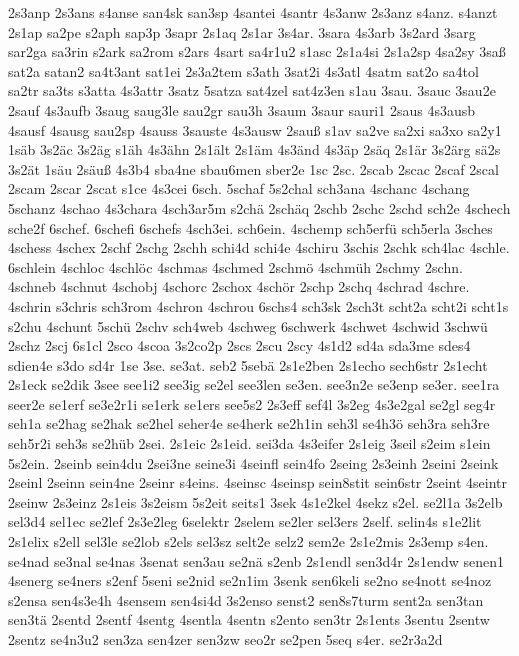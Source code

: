 {2s3anp
2s3ans
s4anse
san4sk
san3sp
4santei
4santr
4s3anw
2s3anz
s4anz.
s4anzt
2s1ap
sa2pe
s2aph
sap3p
3sapr
2s1aq
2s1ar
3s4ar.
3sara
4s3arb
3s2ard
3sarg
sar2ga
sa3rin
s2ark
sa2rom
s2ars
4sart
sa4r1u2
s1asc
2s1a4si
2s1a2sp
4sa2sy
3saß
sat2a
satan2
sa4t3ant
sat1ei
2s3a2tem
s3ath
3sat2i
4s3atl
4satm
sat2o
sa4tol
sa2tr
sa3ts
s3atta
4s3attr
3satz
5satza
sat4zel
sat4z3en
s1au
3sau.
3sauc
3sau2e
2sauf
4s3aufb
3saug
saug3le
sau2gr
sau3h
3saum
3saur
sauri1
2saus
4s3ausb
4sausf
4sausg
sau2sp
4sauss
3sauste
4s3ausw
2sauß
s1av
sa2ve
sa2xi
sa3xo
sa2y1
1säb
3s2äc
3s2äg
s1äh
4s3ähn
2s1ält
2s1äm
4s3änd
4s3äp
2säq
2s1är
3s2ärg
sä2s
3s2ät
1säu
2säuß
4s3b4
sba4ne
sbau6men
sber2e
1sc
2sc.
2scab
2scac
2scaf
2scal
2scam
2scar
2scat
s1ce
4s3cei
6sch.
5schaf
5s2chal
sch3ana
4schanc
4schang
5schanz
4schao
4s3chara
4sch3ar5m
s2chä
2schäq
2schb
2schc
2schd
sch2e
4schech
sche2f
6schef.
6schefi
6schefs
4sch3ei.
sch6ein.
4schemp
sch5erfü
sch5erla
3sches
4schess
4schex
2schf
2schg
2schh
schi4d
schi4e
4schiru
3schis
2schk
sch4lac
4schle.
6schlein
4schloc
4schlöc
4schmas
4schmed
2schmö
4schmüh
2schmy
2schn.
4schneb
4schnut
4schobj
4schorc
2schox
4schör
2schp
2schq
4schrad
4schre.
4schrin
s3chris
sch3rom
4schron
4schrou
6schs4
sch3sk
2sch3t
scht2a
scht2i
scht1s
s2chu
4schunt
5schü
2schv
sch4web
4schweg
6schwerk
4schwet
4schwid
3schwü
2schz
2scj
6s1cl
2sco
4scoa
3s2co2p
2scs
2scu
2scy
4s1d2
sd4a
sda3me
sdes4
sdien4e
s3do
sd4r
1se
3se.
se3at.
seb2
5sebä
2s1e2ben
2s1echo
sech6str
2s1echt
2s1eck
se2dik
3see
see1i2
see3ig
se2el
see3len
se3en.
see3n2e
se3enp
se3er.
see1ra
seer2e
se1erf
se3e2r1i
se1erk
se1ers
see5s2
2s3eff
sef4l
3s2eg
4s3e2gal
se2gl
seg4r
seh1a
se2hag
se2hak
se2hel
seher4e
se4herk
se2h1in
seh3l
se4h3ö
seh3ra
seh3re
seh5r2i
seh3s
se2hüb
2sei.
2s1eic
2s1eid.
sei3da
4s3eifer
2s1eig
3seil
s2eim
s1ein
5s2ein.
2seinb
sein4du
2sei3ne
seine3i
4seinfl
sein4fo
2seing
2s3einh
2seini
2seink
2seinl
2seinn
sein4ne
2seinr
s4eins.
4seinsc
4seinsp
sein8stit
sein6str
2seint
4seintr
2seinw
2s3einz
2s1eis
3s2eism
5s2eit
seits1
3sek
4s1e2kel
4sekz
s2el.
se2l1a
3s2elb
sel3d4
sel1ec
se2lef
2s3e2leg
6selektr
2selem
se2ler
sel3ers
2self.
selin4s
s1e2lit
2s1elix
s2ell
sel3le
se2lob
s2els
sel3sz
selt2e
selz2
sem2e
2s1e2mis
2s3emp
s4en.
se4nad
se3nal
se4nas
3senat
sen3au
se2nä
s2enb
2s1endl
sen3d4r
2s1endw
senen1
4senerg
se4ners
s2enf
5seni
se2nid
se2n1im
3senk
sen6keli
se2no
se4nott
se4noz
s2ensa
sen4s3e4h
4sensem
sen4si4d
3s2enso
senst2
sen8s7turm
sent2a
sen3tan
sen3tä
2sentd
2sentf
4sentg
4sentla
4sentn
s2ento
sen3tr
2s1ents
3sentu
2sentw
2sentz
se4n3u2
sen3za
sen4zer
sen3zw
seo2r
se2pen
5seq
s4er.
se2r3a2d
}
